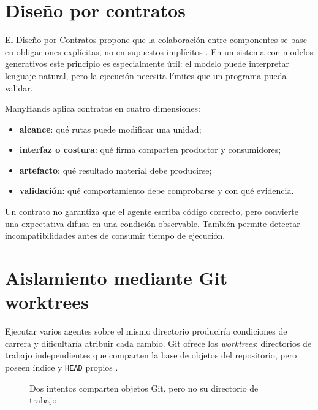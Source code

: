 \section{Diseño por contratos}

El Diseño por Contratos propone que la colaboración entre componentes se base
en obligaciones explícitas, no en supuestos implícitos \cite{meyer1992dbc}. En
un sistema con modelos generativos este principio es especialmente útil: el
modelo puede interpretar lenguaje natural, pero la ejecución necesita límites
que un programa pueda validar.

ManyHands aplica contratos en cuatro dimensiones:

\begin{itemize}
  \item \textbf{alcance}: qué rutas puede modificar una unidad;
  \item \textbf{interfaz o costura}: qué firma comparten productor y
  consumidores;
  \item \textbf{artefacto}: qué resultado material debe producirse;
  \item \textbf{validación}: qué comportamiento debe comprobarse y con qué
  evidencia.
\end{itemize}

Un contrato no garantiza que el agente escriba código correcto, pero convierte
una expectativa difusa en una condición observable. También permite detectar
incompatibilidades antes de consumir tiempo de ejecución.

\section{Aislamiento mediante Git worktrees}

Ejecutar varios agentes sobre el mismo directorio produciría condiciones de
carrera y dificultaría atribuir cada cambio. Git ofrece los \emph{worktrees}:
directorios de trabajo independientes que comparten la base de objetos del
repositorio, pero poseen índice y \texttt{HEAD} propios \cite{chacon2014pro}.

\begin{figure}[htbp]
  \centering
  \caption{Dos intentos comparten objetos Git, pero no su directorio de trabajo.}
  \label{fig:git-worktrees}
\end{figure}

